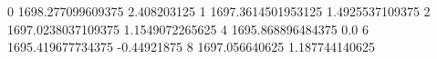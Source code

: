 0 1698.277099609375 2.408203125
1 1697.3614501953125 1.4925537109375
2 1697.0238037109375 1.1549072265625
4 1695.868896484375 0.0
6 1695.419677734375 -0.44921875
8 1697.056640625 1.187744140625
